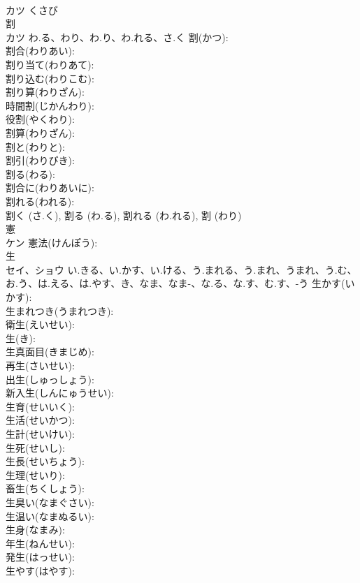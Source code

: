\documentclass[8pt]{extreport}
\begin{document}
\begin{CJK}{UTF8}{min}
\\	カツ	くさび		
\\	割			
\\	カツ	わ.る、わり、わ.り、わ.れる、さ.く	割(かつ): 
\\	割合(わりあい): 
\\	割り当て(わりあて): 
\\	割り込む(わりこむ): 
\\	割り算(わりざん): 
\\	時間割(じかんわり): 
\\	役割(やくわり): 
\\	割算(わりざん): 
\\	割と(わりと): 
\\	割引(わりびき): 
\\	割る(わる): 
\\	割合に(わりあいに): 
\\	割れる(われる): 
\\	割く (さ.く), 割る (わ.る), 割れる (わ.れる), 割 (わり)
\\	憲			
\\	ケン		憲法(けんぽう): 
\\	生			
\\	セイ、ショウ	い.きる、い.かす、い.ける、う.まれる、う.まれ、うまれ、う.む、お.う、は.える、は.やす、き、なま、なま-、な.る、な.す、む.す、-う	生かす(いかす): 
\\	生まれつき(うまれつき): 
\\	衛生(えいせい): 
\\	生(き): 
\\	生真面目(きまじめ): 
\\	再生(さいせい): 
\\	出生(しゅっしょう): 
\\	新入生(しんにゅうせい): 
\\	生育(せいいく): 
\\	生活(せいかつ): 
\\	生計(せいけい): 
\\	生死(せいし): 
\\	生長(せいちょう): 
\\	生理(せいり): 
\\	畜生(ちくしょう): 
\\	生臭い(なまぐさい): 
\\	生温い(なまぬるい): 
\\	生身(なまみ): 
\\	年生(ねんせい): 
\\	発生(はっせい): 
\\	生やす(はやす): 

\end{CJK}
\end{document}

